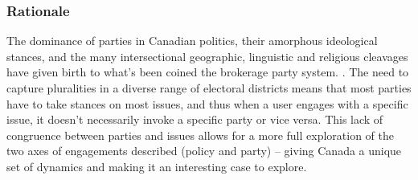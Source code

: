 \subsubsection{Rationale}

The dominance of parties in Canadian politics, their amorphous ideological
stances, and the many intersectional geographic, linguistic and religious
cleavages have given birth to what’s been coined the brokerage party system.
\cite{carty2010political}. The need to capture pluralities in a diverse range of
electoral districts means that most parties have to take stances on most issues,
and thus when a user engages with a specific issue, it doesn't necessarily
invoke a specific party or vice versa. This lack of congruence between parties
and issues allows for a more full exploration of the two axes of engagements
described (policy and party) -- giving Canada a unique set of dynamics and
making it an interesting case to explore.